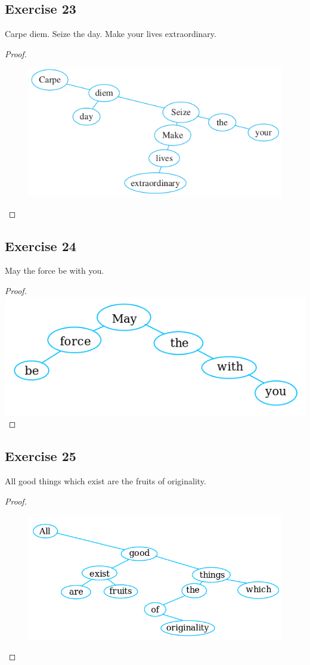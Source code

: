 \documentclass[14pt]{extarticle}
\begin{document}
\subsection{Exercise 23}
Carpe diem. Seize the day. Make your lives extraordinary.
\begin{proof}
\begin{figure}[ht!]
\centering
\includegraphics[scale=0.5]{../images/10.5.23.png}
\end{figure}
\end{proof}

\subsection{Exercise 24}
May the force be with you.
\begin{proof}
\includegraphics[scale=0.5]{../images/10.5.24.png}
\end{proof}

\subsection{Exercise 25}
All good things which exist are the fruits of originality.
\begin{proof}
\begin{figure}[ht!]
\centering
\includegraphics[scale=0.5]{../images/10.5.25.png}
\end{figure}
\end{proof}
\end{document}
